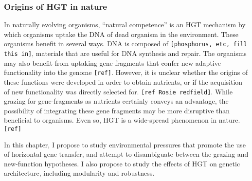\subsubsection{Origins of HGT in nature}

In naturally evolving organisms, “natural competence” is an HGT mechanism by which organisms uptake the DNA of dead organism in the environment. These organisms benefit in several ways. DNA is composed of \verb|[phosphorus, etc, fill this in]|, materials that are useful for DNA synthesis and repair. The organisms may also benefit from uptaking gene-fragments that confer new adaptive functionality into the genome \verb|[ref]|. However, it is unclear whether the origins of these functions were developed in order to obtain nutrients, or if the acquisition of new functionality was directly selected for. \verb|[ref Rosie redfield]|. While grazing for gene-fragments as nutrients certainly conveys an advantage, the possibility of integrating these gene fragments may be more disruptive than beneficial to organisms. Even so, HGT is a wide-spread phenomenon in nature.\verb|[ref]|

In this chapter, I propose to study environmental pressures that promote the use of horizontal gene transfer, and attempt to disambiguate between the grazing and new-function hypotheses. I also propose to study the effects of HGT on genetic architecture, including modularity and robustness.
